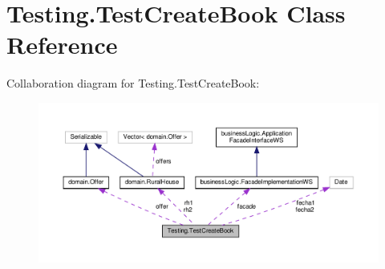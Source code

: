 \hypertarget{class_testing_1_1_test_create_book}{}\section{Testing.\+Test\+Create\+Book Class Reference}
\label{class_testing_1_1_test_create_book}


Collaboration diagram for Testing.\+Test\+Create\+Book\+:
\nopagebreak
\begin{figure}[H]
\begin{center}
\leavevmode
\includegraphics[width=350pt]{class_testing_1_1_test_create_book__coll__graph}
\end{center}
\end{figure}

